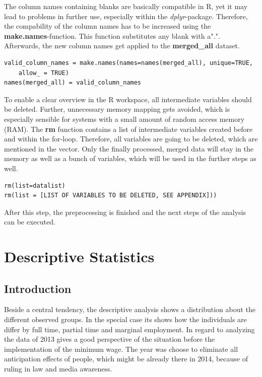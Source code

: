 \documentclass[a4paper]{article}
\begin{document}
The column names containing blanks are basically compatible in R, yet it may lead to problems in further use, especially within the \textit{dplyr}-package. Therefore, the compability of the column names has to be increased using the \textbf{make.names}-function. This function substitutes any blank with a"\textit{.}". Afterwards, the new column names get applied to the \textbf{merged\_all} dataset.
\begin{lstlisting}[firstnumber=93]
valid_column_names = make.names(names=names(merged_all), unique=TRUE, 
	allow_ = TRUE)
names(merged_all) = valid_column_names
\end{lstlisting}

To enable a clear overview in the R workspace, all intermediate variables should be deleted. Further, unnecessary memory mapping gets avoided, which is especially sensible for systems with a small amount of random access memory (RAM). The \textbf{rm} function contains a list of intermediate variables created before and within the for-loop. Therefore, all variables are going to be deleted, which are mentioned in the vector. Only the finally processed, merged data will stay in the memory as well as a bunch of variables, which will be used in the further steps as well.

\begin{lstlisting}[firstnumber=98]
rm(list=datalist)
rm(list = [LIST OF VARIABLES TO BE DELETED, SEE APPENDIX]))
\end{lstlisting}

After this step, the preprocessing is finished and the next steps of the analysis can be executed.


\section{Descriptive Statistics}
\subsection{Introduction}
Beside a central tendency, the descriptive analysis shows a distribution about the different observed groups. In the special case its shows how the individuals are differ by full time, partial time and marginal employment. In regard to \cite{schmitz2017effects} analyzing the data of 2013 gives a good perspective of the situation before the implementation of the minimum wage. The year was choose to eliminate all anticipation effects of people, which might be already there in 2014, because of ruling in law and media awareness. 
\end{document}
